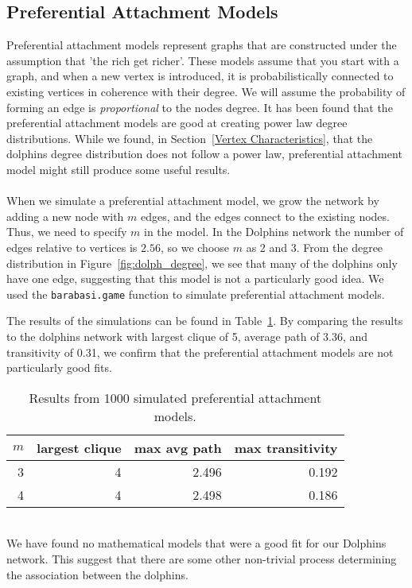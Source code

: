 \documentclass[11pt,a4paper]{article}
\begin{document}
\subsection{Preferential Attachment Models}
Preferential attachment models represent graphs that are constructed under the assumption that 'the rich get richer'. These models assume that you start with a graph, and when a new vertex is introduced, it is probabilistically connected to existing vertices in coherence with their degree. We will assume the probability of forming an edge is \textit{proportional} to the nodes degree.
It has been found that the preferential attachment models are good at creating power law degree distributions. While we found, in Section~\ref{Vertex Characteristics}, that the dolphins degree distribution does not follow a power law, preferential attachment model might still produce some useful results.
\\
\\
When we simulate a preferential attachment model, we grow the network by adding a new node with $m$ edges, and the edges connect to the existing nodes. Thus, we need to specify $m$ in the model. In the Dolphins network the number of edges relative to vertices is $2.56$, so we choose $m$ as 2 and 3. From the degree distribution in Figure~\ref{fig:dolph_degree}, we see that many of the dolphins only have one edge, suggesting that this model is not a particularly good idea.
We used the \verb+barabasi.game+ function to simulate preferential attachment models.

The results of the simulations can be found in Table~\ref{tab:PAM}. By comparing the results to the dolphins network with largest clique of 5, average path of 3.36, and transitivity of 0.31, we confirm that the preferential attachment models are not particularly good fits.
\\
%
\begin{table}[h!tbp]
    \centering
    \caption{Results from 1000 simulated preferential attachment models.}
    \label{tab:PAM}
    \begin{tabular}{rrrr}
        \hline
         $m$ &  largest clique &  max avg path &  max transitivity  \\
        \hline
        3 &  4 & 2.496 & 0.192 \\
        4 & 4 &  2.498 & 0.186 \\
        \hline
    \end{tabular}
\end{table}
%
\\
We have found no mathematical models that were a good fit for our Dolphins network.
This suggest that there are some other non-trivial process determining the association between the dolphins.
\end{document}
